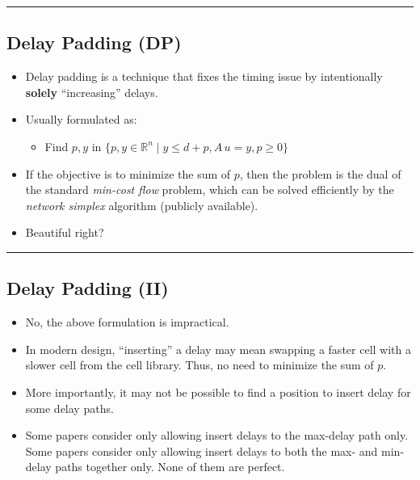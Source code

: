\documentclass[
]{article}
\providecommand{\tightlist}{%
  \setlength{\itemsep}{0pt}\setlength{\parskip}{0pt}}
\begin{document}
\begin{center}\rule{0.5\linewidth}{0.5pt}\end{center}

\subsection{Delay Padding (DP)}\label{delay-padding-dp}

\begin{itemize}
\tightlist
\item
  Delay padding is a technique that fixes the timing issue by
  intentionally \textbf{solely} ``increasing'' delays.
\item
  Usually formulated as:

  \begin{itemize}
  \tightlist
  \item
    Find \(p, y\) in
    \(\{p, y \in \mathbb{R}^n \mid y \leq d + p, A\,u = y, p \geq 0\}\)
  \end{itemize}
\item
  If the objective is to minimize the sum of \(p\), then the problem is
  the dual of the standard \emph{min-cost flow} problem, which can be
  solved efficiently by the \emph{network simplex} algorithm (publicly
  available).
\item
  Beautiful right?
\end{itemize}

\begin{center}\rule{0.5\linewidth}{0.5pt}\end{center}

\subsection{Delay Padding (II)}\label{delay-padding-ii}

\begin{itemize}
\tightlist
\item
  No, the above formulation is impractical.
\item
  In modern design, ``inserting'' a delay may mean swapping a faster
  cell with a slower cell from the cell library. Thus, no need to
  minimize the sum of \(p\).
\item
  More importantly, it may not be possible to find a position to
  insert delay for some delay paths.
\item
  Some papers consider only allowing insert delays to the max-delay
  path only. Some papers consider only allowing insert delays to both
  the max- and min-delay paths together only. None of them are
  perfect.
\end{itemize}
\end{document}
